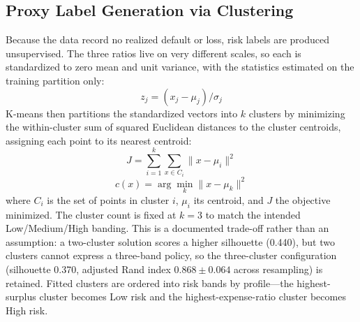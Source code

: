 \subsection{Proxy Label Generation via Clustering}\label{subsec:clustering}
Because the data record no realized default or loss, risk labels are produced
unsupervised. The three ratios live on very different scales, so each is standardized to
zero mean and unit variance, with the statistics estimated on the training partition
only:
\begin{equation}\label{eq:standardize}
z_j = (x_j - \mu_j) / \sigma_j
\end{equation}
K-means then partitions the standardized vectors into $k$ clusters by minimizing the
within-cluster sum of squared Euclidean distances to the cluster centroids, assigning
each point to its nearest centroid:
\begin{equation}\label{eq:kmeans}
J = \sum_{i=1}^{k} \sum_{x \in C_i} \lVert x - \mu_i \rVert^2
\end{equation}
\begin{equation}\label{eq:assign}
c(x) = \arg\min_k \lVert x - \mu_k \rVert^2
\end{equation}
where $C_i$ is the set of points in cluster $i$, $\mu_i$ its centroid, and $J$ the
objective minimized. The cluster count is fixed at $k = 3$ to match the intended
Low/Medium/High banding. This is a documented trade-off rather than an assumption: a
two-cluster solution scores a higher silhouette (0.440), but two clusters cannot express
a three-band policy, so the three-cluster configuration (silhouette 0.370, adjusted Rand
index $0.868 \pm 0.064$ across resampling) is retained. Fitted clusters are ordered into
risk bands by profile---the highest-surplus cluster becomes Low risk and the
highest-expense-ratio cluster becomes High risk.


